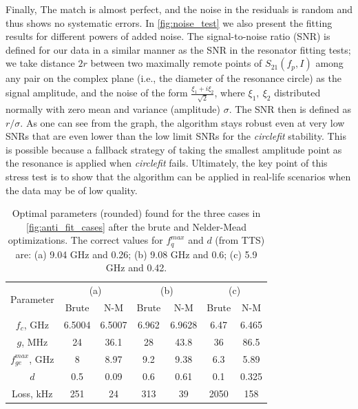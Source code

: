 \documentclass[%
 aip,
 amsmath,amssymb,
 reprint,%
]{revtex4-1}
\begin{document}
Finally, The match is almost perfect, and the noise in the residuals is random and thus shows no systematic errors. In \autoref{fig:noise_test} we also present the fitting results for different powers of added noise. The signal-to-noise ratio (SNR) is defined for our data in a similar manner as the SNR in the resonator fitting tests\cite{probst2015}; we take distance $2r$ between two maximally remote points of $S_{21}(f_p, I)$ among any pair on the complex plane (i.e., the diameter of the resonance circle) as the signal amplitude, and the noise of the form $\frac{\xi_1+i\xi_2}{\sqrt 2}$, where $\xi_1,\ \xi_2$ distributed normally with zero mean and variance (amplitude) $\sigma$. The SNR then is defined as $r/\sigma$. As one can see from the graph, the algorithm stays robust even at very low SNRs that are even lower than the low limit SNRs for the \textit{circlefit} stability. This is possible because a fallback strategy of taking the smallest amplitude point as the resonance is applied when \textit{circlefit} fails. Ultimately, the key point of this stress test is to show that the algorithm can be applied in real-life scenarios when the data may be of low quality.
\begin{table}[b]
	\centering
	\begin{ruledtabular}
		\begin{tabular}{c|cc|cc|cc} 
			\multirow{2}{*}{Parameter} & 
			\multicolumn{2}{c}{(a)} & 
			\multicolumn{2}{c}{(b)} & \multicolumn{2}{c}{(c)}\\
			& Brute & N-M & Brute & N-M & Brute& N-M\\
			\hline
			$f_c$, GHz &6.5004 & 6.5007 & 6.962 & 6.9628 &  6.47 & 6.465\\ 
			$g$, MHz & 24 & 36.1 & 28 & 43.8 & 36 & 86.5\\
			$f_{ge}^{max}$, GHz & 8 &8.97 &9.2& 9.38& 6.3& 5.89\\
			$d$ &0.5&0.09&0.6&0.61&0.1& 0.325 \\\hline
			Loss, kHz & 251 & 24 &313& 39 &2050& 158
		\end{tabular} 
	\end{ruledtabular}
	\caption{Optimal parameters (rounded) found for the three cases in \autoref{fig:anti_fit_cases} after the brute and Nelder-Mead optimizations. The correct values for $f_q^{max}$ and $d$ (from TTS) are: (a) 9.04 GHz and 0.26; (b) 9.08 GHz and 0.6; (c) 5.9 GHz and 0.42.}
	\label{tab:sts_results}
\end{table}
\end{document}
